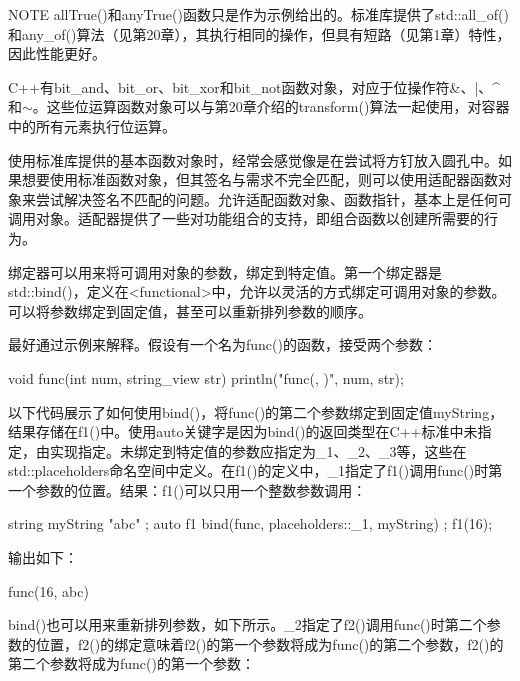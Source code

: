 \begin{myNotic}{NOTE}
allTrue()和anyTrue()函数只是作为示例给出的。标准库提供了std::all\_of()和any\_of()算法（见第20章），其执行相同的操作，但具有短路（见第1章）特性，因此性能更好。
\end{myNotic}


C++有bit\_and、bit\_or、bit\_xor和bit\_not函数对象，对应于位操作符\&、|、\^{}和$\sim$。这些位运算函数对象可以与第20章介绍的transform()算法一起使用，对容器中的所有元素执行位运算。


使用标准库提供的基本函数对象时，经常会感觉像是在尝试将方钉放入圆孔中。如果想要使用标准函数对象，但其签名与需求不完全匹配，则可以使用适配器函数对象来尝试解决签名不匹配的问题。允许适配函数对象、函数指针，基本上是任何可调用对象。适配器提供了一些对功能组合的支持，即组合函数以创建所需要的行为。


绑定器可以用来将可调用对象的参数，绑定到特定值。第一个绑定器是std::bind()，定义在<functional>中，允许以灵活的方式绑定可调用对象的参数。可以将参数绑定到固定值，甚至可以重新排列参数的顺序。

最好通过示例来解释。假设有一个名为func()的函数，接受两个参数：

\begin{cpp}
void func(int num, string_view str)
{
    println("func({}, {})", num, str);
}
\end{cpp}

以下代码展示了如何使用bind()，将func()的第二个参数绑定到固定值myString，结果存储在f1()中。使用auto关键字是因为bind()的返回类型在C++标准中未指定，由实现指定。未绑定到特定值的参数应指定为\_1、\_2、\_3等，这些在std::placeholders命名空间中定义。在f1()的定义中，\_1指定了f1()调用func()时第一个参数的位置。结果：f1()可以只用一个整数参数调用：

\begin{cpp}
string myString { "abc" };
auto f1 { bind(func, placeholders::_1, myString) };
f1(16);
\end{cpp}

输出如下：

\begin{shell}
func(16, abc)
\end{shell}

bind()也可以用来重新排列参数，如下所示。\_2指定了f2()调用func()时第二个参数的位置，f2()的绑定意味着f2()的第一个参数将成为func()的第二个参数，f2()的第二个参数将成为func()的第一个参数：

